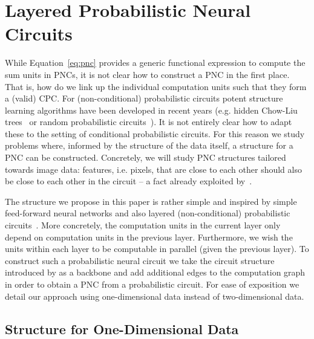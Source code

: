 \documentclass[letterpaper]{article} %
\newcommand{\eg}{e.g.\xspace}
\newcommand{\ie}{i.e.\xspace}
\newtheorem{definition}[theorem]{Definition}
\begin{document}









\section{Layered Probabilistic Neural Circuits}



While Equation~\ref{eq:pnc} provides a generic functional expression to compute the sum units in PNCs, it is not clear how to construct a PNC in the first place. That is, how do we link up the individual computation units such that they form a (valid) CPC.
For (non-conditional) probabilistic circuits potent structure learning algorithms have been developed in recent years  (\eg  hidden Chow-Liu trees~\citep{liu2021tractable} or random probabilistic circuits~\citep{di2021random}). It is not entirely clear how to adapt these to the setting of conditional probabilistic circuits. For this reason we study problems where, informed by the structure of the data itself, a structure for a PNC can be constructed. Concretely, we will study PNC structures tailored towards image data: features, \ie pixels, that are close to each other should also be close to each other in the circuit -- a fact already exploited by~\citet{poon2011sum}.

The structure we propose in this paper is rather simple and inspired by simple feed-forward neural networks and also layered (non-conditional) probabilistic circuits~\citep{peharz2020einsum}. More concretely,
the computation units in the current layer only depend on computation units in the previous layer. Furthermore, we wish the units within each layer to be computable in parallel (given the previous layer). To construct such a probabilistic neural circuit we take the circuit structure introduced by \citet{shih2021hyperspns} as a backbone and add additional edges to the computation graph in order to obtain a PNC from a probabilistic circuit.
For ease of exposition we detail our approach using one-dimensional data instead of two-dimensional data.

\subsection{Structure for One-Dimensional Data}
\end{document}

